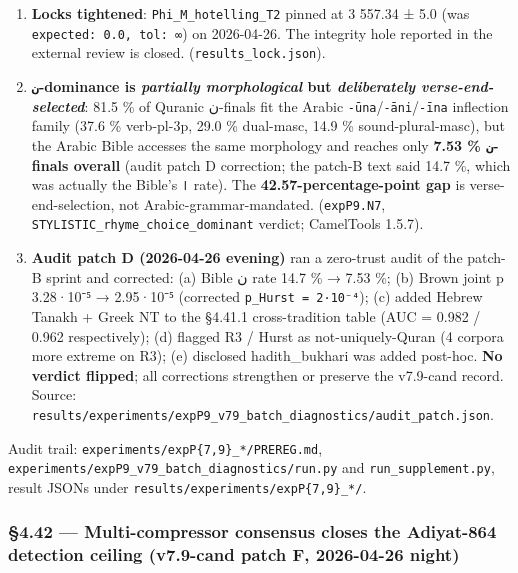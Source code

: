 \documentclass[
]{article}
\begin{document}
\begin{enumerate}
  EL = 0.273. (\texttt{expP9.N4}).
\item
  \textbf{Locks tightened}: \texttt{Phi\_M\_hotelling\_T2} pinned at 3
  557.34 ± 5.0 (was \texttt{expected:\ 0.0,\ tol:\ ∞}) on 2026-04-26.
  The integrity hole reported in the external review is closed.
  (\texttt{results\_lock.json}).
\item
  \textbf{\texttt{ن}-dominance is \emph{partially morphological} but
  \emph{deliberately verse-end-selected}}: 81.5 \% of Quranic ن-finals
  fit the Arabic \texttt{-ūna}/\texttt{-āni}/\texttt{-īna} inflection
  family (37.6 \% verb-pl-3p, 29.0 \% dual-masc, 14.9 \%
  sound-plural-masc), but the Arabic Bible accesses the same morphology
  and reaches only \textbf{7.53 \% \texttt{ن}-finals overall} (audit
  patch D correction; the patch-B text said 14.7 \%, which was actually
  the Bible's \texttt{ا} rate). The \textbf{42.57-percentage-point gap}
  is verse-end-selection, not Arabic-grammar-mandated.
  (\texttt{expP9.N7}, \texttt{STYLISTIC\_rhyme\_choice\_dominant}
  verdict; CamelTools 1.5.7).
\item
  \textbf{Audit patch D (2026-04-26 evening)} ran a zero-trust audit of
  the patch-B sprint and corrected: (a) Bible ن rate 14.7 \% → 7.53 \%;
  (b) Brown joint p 3.28·10⁻⁵ → 2.95·10⁻⁵ (corrected
  \texttt{p\_Hurst\ =\ 2·10⁻⁴}); (c) added Hebrew Tanakh + Greek NT to
  the §4.41.1 cross-tradition table (AUC = 0.982 / 0.962 respectively);
  (d) flagged R3 / Hurst as not-uniquely-Quran (4 corpora more extreme
  on R3); (e) disclosed hadith\_bukhari was added post-hoc. \textbf{No
  verdict flipped}; all corrections strengthen or preserve the v7.9-cand
  record. Source:
  \texttt{results/experiments/expP9\_v79\_batch\_diagnostics/audit\_patch.json}.
\end{enumerate}

Audit trail: \texttt{experiments/expP\{7,9\}\_*/PREREG.md},
\texttt{experiments/expP9\_v79\_batch\_diagnostics/run.py} and
\texttt{run\_supplement.py}, result JSONs under
\texttt{results/experiments/expP\{7,9\}\_*/}.

\subsubsection{§4.42 --- Multi-compressor consensus closes the
Adiyat-864 detection ceiling (v7.9-cand patch F, 2026-04-26
night)}\label{multi-compressor-consensus-closes-the-adiyat-864-detection-ceiling-v7.9-cand-patch-f-2026-04-26-night}
\end{document}

